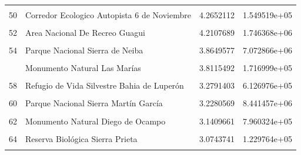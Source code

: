 \documentclass[10pt,landscape,a3paper]{article}
\begin{document}
\begin{longtable}[t]{llrr}
\cellcolor{lightgray}{49} & \cellcolor{lightgray}{Refugio de Vida Silvestre Ría Maimón} & \cellcolor{lightgray}{4.2676421} & \cellcolor{lightgray}{2.060333e+05}\\
50 & Corredor Ecologico Autopista 6 de Noviembre & 4.2652112 & 1.549519e+05\\
\addlinespace
\cellcolor{lightgray}{51} & \cellcolor{lightgray}{Reserva Forestal Villarpando} & \cellcolor{lightgray}{4.2454794} & \cellcolor{lightgray}{3.377307e+06}\\
52 & Area Nacional De Recreo Guagui & 4.2107689 & 1.746368e+06\\
\cellcolor{lightgray}{53} & \cellcolor{lightgray}{Parque Nacional Máximo Gómez} & \cellcolor{lightgray}{4.2038593} & \cellcolor{lightgray}{1.778012e+06}\\
54 & Parque Nacional Sierra de Neiba & 3.8649577 & 7.072866e+06\\
\cellcolor{lightgray}{55} & \cellcolor{lightgray}{Refugio de Vida Silvestre Río Higuamo} & \cellcolor{lightgray}{3.8293304} & \cellcolor{lightgray}{7.081435e+05}\\
\addlinespace
56 & Monumento Natural Las Marías & 3.8115492 & 1.716999e+05\\
\cellcolor{lightgray}{57} & \cellcolor{lightgray}{Reserva Cientifica Loma Quita Espuela} & \cellcolor{lightgray}{3.4800012} & \cellcolor{lightgray}{2.635633e+06}\\
58 & Refugio de Vida Silvestre Bahia de Luperón & 3.2791403 & 6.126976e+05\\
\cellcolor{lightgray}{59} & \cellcolor{lightgray}{Reserva Forestal Barrero} & \cellcolor{lightgray}{3.2605838} & \cellcolor{lightgray}{1.012874e+07}\\
60 & Parque Nacional Sierra Martín García & 3.2280569 & 8.441457e+06\\
\addlinespace
\cellcolor{lightgray}{61} & \cellcolor{lightgray}{Monumento Natural Reserva Antropológica Cuevas de Borbón o del Pomier} & \cellcolor{lightgray}{3.1927358} & \cellcolor{lightgray}{1.603398e+05}\\
62 & Monumento Natural Diego de Ocampo & 3.1409661 & 7.960324e+05\\
\cellcolor{lightgray}{63} & \cellcolor{lightgray}{Corredor Ecologico Autopista Juan Bosch} & \cellcolor{lightgray}{3.1337140} & \cellcolor{lightgray}{1.738543e+05}\\
64 & Reserva Biológica Sierra Prieta & 3.0743741 & 1.229764e+05\\
\cellcolor{lightgray}{65} & \cellcolor{lightgray}{Refugio de Vida Silvestre Laguna Saladilla} & \cellcolor{lightgray}{3.0472813} & \cellcolor{lightgray}{9.481367e+05}\\

\end{longtable}
\end{document}
